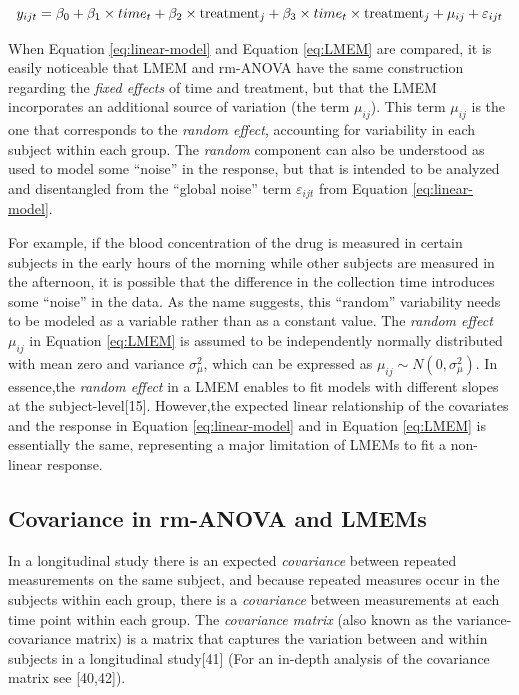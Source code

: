 \documentclass[
]{article}
\begin{document}
\begin{equation}
y_{ijt} = \beta_0+ \beta_1 \times time_{t} + \beta_2 \times \textrm{treatment}_{j} + \beta_3 \times time_{t}\times \textrm{treatment}_{j}+\mu_{ij} +\varepsilon_{ijt}\\ 
\label{eq:LMEM}
\end{equation}

When Equation \eqref{eq:linear-model} and Equation \eqref{eq:LMEM} are compared, it is easily noticeable that LMEM and rm-ANOVA have the same construction regarding the \emph{fixed effects} of time and treatment, but that the LMEM incorporates an additional source of variation (the term \(\mu_{ij}\)). This term \(\mu_{ij}\) is the one that corresponds to the \emph{random effect}, accounting for variability in each subject within each group. The \emph{random} component can also be understood as used to model some ``noise'' in the response, but that is intended to be analyzed and disentangled from the ``global noise'' term \(\varepsilon_{ijt}\) from Equation \eqref{eq:linear-model}.

For example, if the blood concentration of the drug is measured in certain subjects in the early hours of the morning while other subjects are measured in the afternoon, it is possible that the difference in the collection time introduces some ``noise'' in the data. As the name suggests, this ``random'' variability needs to be modeled as a variable rather than as a constant value. The \emph{random effect} \(\mu_{ij}\) in Equation \eqref{eq:LMEM} is assumed to be independently normally distributed with mean zero and variance \(\sigma^2_\mu\), which can be expressed as \(\mu_{ij} \sim N(0,\sigma^2_\mu)\). In essence,the \emph{random effect} in a LMEM enables to fit models with different slopes at the subject-level{[}15{]}. However,the expected linear relationship of the covariates and the response in Equation \eqref{eq:linear-model} and in Equation \eqref{eq:LMEM} is essentially the same, representing a major limitation of LMEMs to fit a non-linear response.

\hypertarget{covariance-in-rm-anova-and-lmems}{%
\subsection{Covariance in rm-ANOVA and LMEMs}\label{covariance-in-rm-anova-and-lmems}}

In a longitudinal study there is an expected \emph{covariance} between repeated measurements on the same subject, and because repeated measures occur in the subjects within each group, there is a \emph{covariance} between measurements at each time point within each group. The \emph{covariance matrix} (also known as the variance-covariance matrix) is a matrix that captures the variation between and within subjects in a longitudinal study{[}41{]} (For an in-depth analysis of the covariance matrix see {[}40,42{]}).
\end{document}

